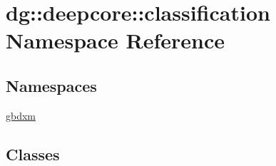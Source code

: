 \hypertarget{namespacedg_1_1deepcore_1_1classification}{}\section{dg\+:\+:deepcore\+:\+:classification Namespace Reference}
\label{namespacedg_1_1deepcore_1_1classification}
\subsection*{Namespaces}
\begin{DoxyCompactItemize}
\item 
 \hyperlink{namespacedg_1_1deepcore_1_1classification_1_1gbdxm}{gbdxm}
\end{DoxyCompactItemize}
\subsection*{Classes}
